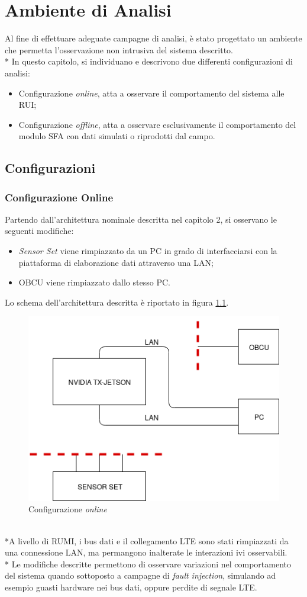 \chapter{Ambiente di Analisi}
Al fine di effettuare adeguate campagne di analisi, \`e stato progettato un ambiente che permetta l'osservazione non intrusiva del sistema descritto.\\*
In questo capitolo, si individuano e descrivono due differenti configurazioni di analisi:
\begin{itemize}
	\item Configurazione \emph{online}, atta a osservare il comportamento del sistema alle RUI;
	\item Configurazione \emph{offline}, atta a osservare esclusivamente il comportamento del modulo SFA con dati simulati o riprodotti dal campo.
\end{itemize} 
\section{Configurazioni}
\subsection{Configurazione Online}
Partendo dall'architettura nominale descritta nel capitolo 2, si osservano le seguenti modifiche:
\begin{itemize}
	\item \emph{Sensor Set} viene rimpiazzato da un PC in grado di interfacciarsi con la piattaforma di elaborazione dati attraverso una LAN;
	\item OBCU viene rimpiazzato dallo stesso PC.
\end{itemize}
Lo schema dell'architettura descritta \`e riportato in figura \ref{fig:hwtest}.
\begin{figure}
	\centering
	\includegraphics[width=0.7\linewidth]{img/hwtest}
	\caption{Configurazione \emph{online}}
	\label{fig:hwtest}
\end{figure}
\\*A livello di RUMI, i bus dati e il collegamento LTE sono stati rimpiazzati da una connessione LAN, ma permangono inalterate le interazioni ivi osservabili.\\*
Le modifiche descritte permettono di osservare variazioni nel comportamento del sistema quando sottoposto a campagne di \emph{fault injection}, simulando ad esempio guasti hardware nei bus dati, oppure perdite di segnale LTE.
